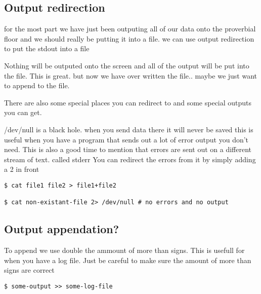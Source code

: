 \documentclass[a4paper]{article}
\begin{document}
\subsection*{Output redirection}
\label{sec:org21f893d}
\begin{notes}
	for the most part we have just been outputing all of our data onto the
	proverbial floor and we should really be putting it into a file. we can use
	output redirection to put the stdout into a file

	Nothing will be outputed onto the screen and all of the output will be put
	into the file. This is great. but now we have over written the file.. maybe we
	just want to append to the file.

	There are also some special places you can redirect to and some special outputs
	you can get.

	/dev/null is a black hole. when you send data there it will never be saved this
	is useful when you have a program that sends out a lot of error output you don't
	need. This is also a good time to mention that errors are sent out on a
	different stream of text. called stderr You can redirect the errors from it by
	simply adding a 2 in front
\end{notes}

\begin{verbatim}
$ cat file1 file2 > file1+file2

$ cat non-existant-file 2> /dev/null # no errors and no output
\end{verbatim}

\subsection*{Output appendation?}
\label{sec:org89ed338}
\begin{notes}
	To append we use double the ammount of more than signs. This is usefull for when
	you have a log file. Just be careful to make sure the amount of more than signs
	are correct
\end{notes}

\begin{verbatim}
$ some-output >> some-log-file
\end{verbatim}
\end{document}
